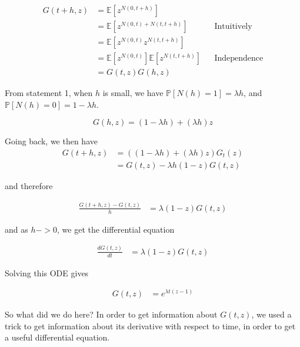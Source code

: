 \documentclass{article}
\begin{document}
\begin{align*}
G(t+h,z) &= \mathbb{E}[z^{N(0, t+h)}] \\
&= \mathbb{E}[z^{N(0, t) + N(t, t+h)}] && \text{Intuitively} \\
&= \mathbb{E}[z^{N(0, t)} z^{N(t, t+h)}] \\
&= \mathbb{E}[z^{N(0, t)}]  \mathbb{E}[z^{N(t, t+h)}] && \text{Independence} \\
&= G(t,z) G(h,z)
\end{align*}


From statement 1, when $h$ is small, we have $\mathbb{P}[N(h) = 1] = \lambda h$, and $\mathbb{P}[N(h) = 0] = 1 - \lambda h$. 

\begin{equation}
G(h,z) = (1 - \lambda h) + (\lambda h)z
\end{equation}

Going back, we then have 
\begin{align*}
G(t+h,z) &= ((1 - \lambda h) + (\lambda h)z) G_t(z) \\
&= G(t,z) - \lambda h(1-z) G(t,z)
\end{align*}

and therefore

\begin{align*}
\frac{G(t+h,z) - G(t,z)}{h} &= \lambda (1-z) G(t,z)
\end{align*}

and as $h -> 0$, we get the differential equation 

\begin{align*}
\frac{dG(t,z)}{dt} &= \lambda (1-z) G(t,z)
\end{align*}


Solving this ODE gives 

\begin{align*}
G(t,z) &= e^{\lambda t (z-1)}
\end{align*}



So what did we do here? In order to get information about $G(t,z)$, we used a trick to get information about its derivative with respect to time, in order to get a useful differential equation. 
\end{document}
